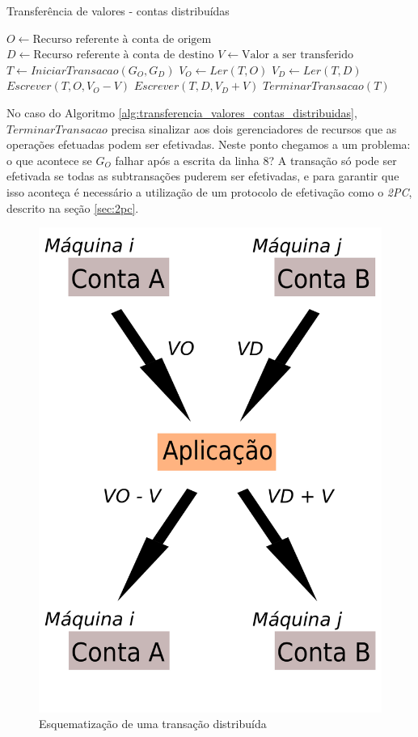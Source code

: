 \documentclass[11pt,twoside,a4paper]{book}
\begin{document}
\begin{algorithm}
\caption{Transferência de valores - contas distribuídas}
\label{alg:transferencia_valores_contas_distribuidas}
\begin{algorithmic}[1]
\State $O \gets \text{Recurso referente à conta de origem}$
\State $D \gets \text{Recurso referente à conta de destino}$
\State $V \gets \text{Valor a ser transferido}$
\State $T \gets IniciarTransacao(G_O, G_D)$
\State $V_O \gets Ler(T, O)$
    \State $V_D \gets Ler(T, D)$
    \State $Escrever(T, O, V_O - V)$
    \State $Escrever(T, D, V_D + V)$
\EndIf
\State $TerminarTransacao(T)$
\end{algorithmic}
\end{algorithm}

No caso do Algoritmo \ref{alg:transferencia_valores_contas_distribuidas}, $TerminarTransacao$ precisa sinalizar aos dois gerenciadores de recursos que as operações efetuadas podem ser efetivadas. Neste ponto chegamos a um problema: o que acontece se $G_O$ falhar após a escrita da linha 8? A transação só pode ser efetivada se todas as subtransações puderem ser efetivadas, e para garantir que isso aconteça é necessário a utilização de um protocolo de efetivação como o \emph{2PC}, descrito na seção \ref{sec:2pc}.


\begin{figure}
  \centering
  \includegraphics[width=.40\textwidth]{transacao_distribuida} 
  \caption{Esquematização de uma transação distribuída}
  \label{fig:transacao_distribuida} 
\end{figure}
\end{document}
